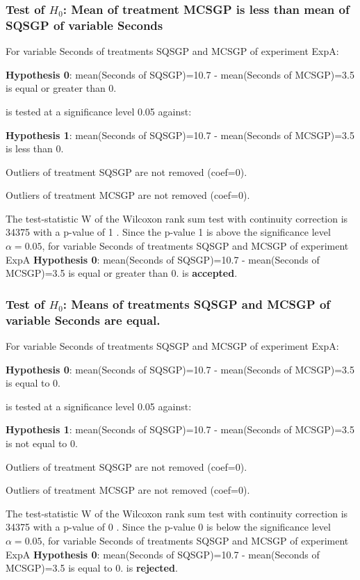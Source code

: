 \documentclass[18pt,c]{beamer}
\begin{document}
\begin{frame}[t]
 \frametitle{Test of $H_{0}$: Mean of treatment MCSGP is less than mean of SQSGP of variable Seconds }
 \scriptsize
 For variable Seconds of treatments SQSGP and MCSGP of experiment ExpA:

\vspace{1mm}
{\bf Hypothesis 0}: mean(Seconds of SQSGP)=10.7 - mean(Seconds of MCSGP)=3.5 is equal or greater than 0.


 \begin{center} is tested at a significance level 0.05 against: \end{center}

{\bf Hypothesis 1}: mean(Seconds of SQSGP)=10.7 - mean(Seconds of MCSGP)=3.5 is less than 0.
\vspace{1mm}
\vspace{1mm}

 Outliers of treatment SQSGP  are not removed (coef=0).

 Outliers of treatment MCSGP  are not removed (coef=0).
\vspace{1mm}
 
 The test-statistic W of the Wilcoxon rank sum test with continuity correction is 34375 with a p-value of 1 .
 Since the p-value 1 is above the significance level $\alpha= 0.05 $,
 for variable Seconds of treatments SQSGP and MCSGP of experiment ExpA 
 {\bf Hypothesis 0}: mean(Seconds of SQSGP)=10.7 - mean(Seconds of MCSGP)=3.5 is equal or greater than 0.
is {\bf accepted}.

 \end{frame}
\begin{frame}[t]
 \frametitle{Test of $H_{0}$: Means of treatments SQSGP and MCSGP of variable Seconds are equal. }
 \scriptsize
 For variable Seconds of treatments SQSGP and MCSGP of experiment ExpA:

\vspace{1mm}
{\bf Hypothesis 0}: mean(Seconds of SQSGP)=10.7 - mean(Seconds of MCSGP)=3.5 is equal to 0.


 \begin{center} is tested at a significance level 0.05 against: \end{center}

{\bf Hypothesis 1}: mean(Seconds of SQSGP)=10.7 - mean(Seconds of MCSGP)=3.5 is not equal to 0.
\vspace{1mm}
\vspace{1mm}

 Outliers of treatment SQSGP  are not removed (coef=0).

 Outliers of treatment MCSGP  are not removed (coef=0).
\vspace{1mm}
 
 The test-statistic W of the Wilcoxon rank sum test with continuity correction is 34375 with a p-value of 0 .
 Since the p-value 0 is below the significance level $\alpha= 0.05 $,
 for variable Seconds of treatments SQSGP and MCSGP of experiment ExpA 
 {\bf Hypothesis 0}: mean(Seconds of SQSGP)=10.7 - mean(Seconds of MCSGP)=3.5 is equal to 0.
is {\bf rejected}.

 \end{frame}
\end{document}
